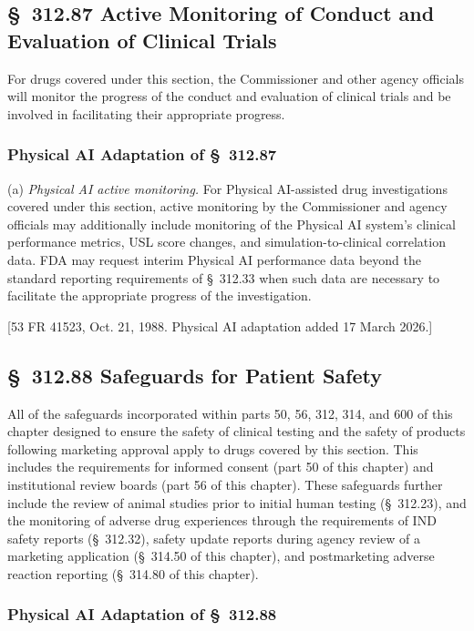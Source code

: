 \subsection{\S~312.87 Active Monitoring of Conduct and Evaluation of Clinical Trials}

For drugs covered under this section, the Commissioner and other agency officials will monitor the progress of the conduct and evaluation of clinical trials and be involved in facilitating their appropriate progress.

\subsubsection{Physical AI Adaptation of \S~312.87}

(a) \textit{Physical AI active monitoring.} For Physical AI-assisted drug investigations covered under this section, active monitoring by the Commissioner and agency officials may additionally include monitoring of the Physical AI system's clinical performance metrics, USL score changes, and simulation-to-clinical correlation data. FDA may request interim Physical AI performance data beyond the standard reporting requirements of \S~312.33 when such data are necessary to facilitate the appropriate progress of the investigation.

[53 FR 41523, Oct. 21, 1988. Physical AI adaptation added 17 March 2026.]

\subsection{\S~312.88 Safeguards for Patient Safety}

All of the safeguards incorporated within parts 50, 56, 312, 314, and 600 of this chapter designed to ensure the safety of clinical testing and the safety of products following marketing approval apply to drugs covered by this section. This includes the requirements for informed consent (part 50 of this chapter) and institutional review boards (part 56 of this chapter). These safeguards further include the review of animal studies prior to initial human testing (\S~312.23), and the monitoring of adverse drug experiences through the requirements of IND safety reports (\S~312.32), safety update reports during agency review of a marketing application (\S~314.50 of this chapter), and postmarketing adverse reaction reporting (\S~314.80 of this chapter).

\subsubsection{Physical AI Adaptation of \S~312.88}

